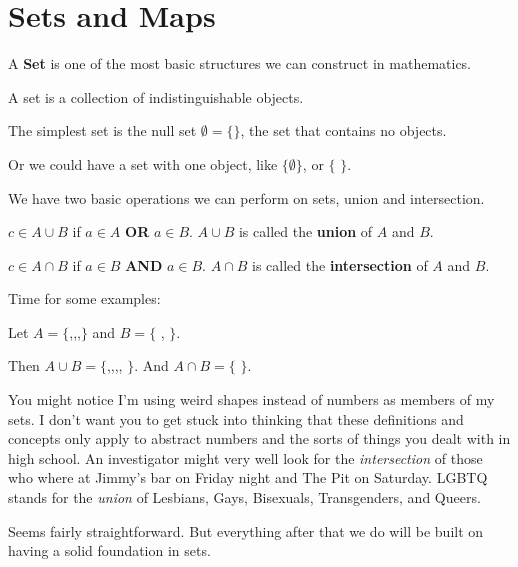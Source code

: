 \chapter{Sets and Maps}

A \textbf{Set} is one of the most basic structures we can construct in mathematics.

\begin{definition}[Set]
  A set is a collection of indistinguishable objects.
\end{definition}

The simplest set is the null set $ \emptyset = \{ \}$, the set that contains no objects.

Or we could have a set with one object, like $\{ \emptyset \}$, or $\{$ $\}$.

We have two basic operations we can perform on sets, union and intersection.

\begin{definition}[Union]
  $c \in A \cup B$ if $a \in  A$ \textbf{OR} $a \in B$. $A\cup B$ is called the \textbf{union} of $A$ and $B$.
\end{definition}

\begin{definition}[Intersection]
  $c \in A \cap B$ if $a \in B$ \textbf{AND} $a \in B$.  $A \cap B$ is called the \textbf{intersection} of $A$ and $B$.
\end{definition}

Time for some examples:

Let $A = \{$,,,$\}$ and $B= \{$ ,  $\}$.

Then $A \cup B = \{$,,,, $\}$.  And $A\cap B = \{$  $\}$.

You might notice I'm using weird shapes instead of numbers as members of my sets.  I don't want you to get stuck into thinking that these definitions and concepts only apply to abstract numbers and the sorts of things you dealt with in high school.  An investigator might very well look for the \textit{intersection} of those who where at Jimmy's bar on Friday night and The Pit on Saturday.  LGBTQ stands for the \textit{union} of Lesbians, Gays, Bisexuals, Transgenders, and Queers.

Seems fairly straightforward. But everything after that we do will be built on having a solid foundation in sets.

